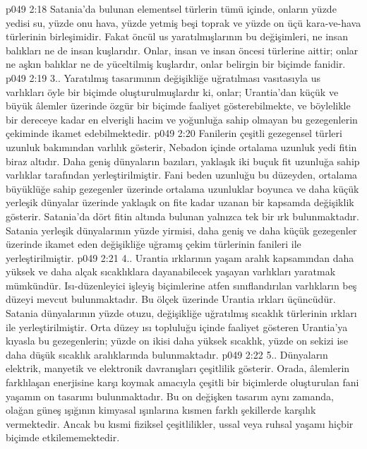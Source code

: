 \vs p049 2:18 Satania’da bulunan elementsel türlerin tümü içinde, onların yüzde yedisi su, yüzde onu hava, yüzde yetmiş beşi toprak ve yüzde on üçü kara\hyp{}ve\hyp{}hava türlerinin birleşimidir. Fakat öncül us yaratılmışlarının bu değişimleri, ne insan balıkları ne de insan kuşlarıdır. Onlar, insan ve insan öncesi türlerine aittir; onlar ne aşkın balıklar ne de yüceltilmiş kuşlardır, onlar belirgin bir biçimde fanidir.
\vs p049 2:19 3.\bibnobreakspace {}. Yaratılmış tasarımının değişikliğe uğratılması vasıtasıyla us varlıkları öyle bir biçimde oluşturulmuşlardır ki, onlar; Urantia’dan küçük ve büyük âlemler üzerinde özgür bir biçimde faaliyet gösterebilmekte, ve böylelikle bir dereceye kadar en elverişli hacim ve yoğunluğa sahip olmayan bu gezegenlerin çekiminde ikamet edebilmektedir.
\vs p049 2:20 Fanilerin çeşitli gezegensel türleri uzunluk bakımından varlılık gösterir, Nebadon içinde ortalama uzunluk yedi fitin biraz altıdır. Daha geniş dünyaların bazıları, yaklaşık iki buçuk fit uzunluğa sahip varlıklar tarafından yerleştirilmiştir. Fani beden uzunluğu bu düzeyden, ortalama büyüklüğe sahip gezegenler üzerinde ortalama uzunluklar boyunca ve daha küçük yerleşik dünyalar üzerinde yaklaşık on fite kadar uzanan bir kapsamda değişiklik gösterir. Satania’da dört fitin altında bulunan yalnızca tek bir ırk bulunmaktadır. Satania yerleşik dünyalarının yüzde yirmisi, daha geniş ve daha küçük gezegenler üzerinde ikamet eden değişikliğe uğramış çekim türlerinin fanileri ile yerleştirilmiştir.
\vs p049 2:21 4.\bibnobreakspace {}. Urantia ırklarının yaşam aralık kapsamından daha yüksek ve daha alçak sıcaklıklara dayanabilecek yaşayan varlıkları yaratmak mümkündür. Isı\hyp{}düzenleyici işleyiş biçimlerine atfen sınıflandırılan varlıkların beş düzeyi mevcut bulunmaktadır. Bu ölçek üzerinde Urantia ırkları üçüncüdür. Satania dünyalarının yüzde otuzu, değişikliğe uğratılmış sıcaklık türlerinin ırkları ile yerleştirilmiştir. Orta düzey ısı topluluğu içinde faaliyet gösteren Urantia’ya kıyasla bu gezegenlerin; yüzde on ikisi daha yüksek sıcaklık, yüzde on sekizi ise daha düşük sıcaklık aralıklarında bulunmaktadır.
\vs p049 2:22 5.\bibnobreakspace {}. Dünyaların elektrik, manyetik ve elektronik davranışları çeşitlilik gösterir. Orada, âlemlerin farklılaşan enerjisine karşı koymak amacıyla çeşitli bir biçimlerde oluşturulan fani yaşamın on tasarımı bulunmaktadır. Bu on değişken tasarım aynı zamanda, olağan güneş ışığının kimyasal ışınlarına kısmen farklı şekillerde karşılık vermektedir. Ancak bu kısmi fiziksel çeşitlilikler, ussal veya ruhsal yaşamı hiçbir biçimde etkilememektedir.
